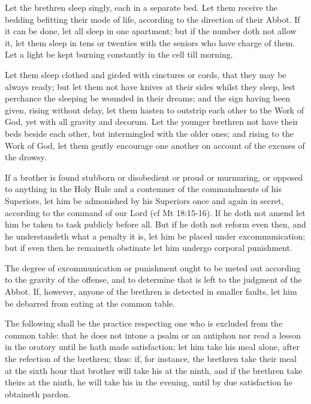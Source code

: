
Let the brethren sleep singly, each in a separate bed. Let them receive the bedding befitting their mode of life, according to the direction of their Abbot. If it can be done, let all sleep in one apartment; but if the number doth not allow it, let them sleep in tens or twenties with the seniors who have charge of them. Let a light be kept burning constantly in the cell till morning.

Let them sleep clothed and girded with cinctures or cords, that they may be always ready; but let them not have knives at their sides whilst they sleep, lest perchance the sleeping be wounded in their dreams; and the sign having been given, rising without delay, let them hasten to outstrip each other to the Work of God, yet with all gravity and decorum. Let the younger brethren not have their beds beside each other, but intermingled with the older ones; and rising to the Work of God, let them gently encourage one another on account of the excuses of the drowsy.


If a brother is found stubborn or disobedient or proud or murmuring, or opposed to anything in the Holy Rule and a contemner of the commandments of his Superiors, let him be admonished by his Superiors once and again in secret, according to the command of our Lord (cf Mt 18:15-16). If he doth not amend let him be taken to task publicly before all. But if he doth not reform even then, and he understandeth what a penalty it is, let him be placed under excommunication; but if even then he remaineth obstinate let him undergo corporal punishment.


The degree of excommunication or punishment ought to be meted out according to the gravity of the offense, and to determine that is left to the judgment of the Abbot. If, however, anyone of the brethren is detected in smaller faults, let him be debarred from eating at the common table.

The following shall be the practice respecting one who is excluded from the common table: that he does not intone a psalm or an antiphon nor read a lesson in the oratory until he hath made satisfaction; let him take his meal alone, after the refection of the brethren; thus: if, for instance, the brethren take their meal at the sixth hour that brother will take his at the ninth, and if the brethren take theirs at the ninth, he will take his in the evening, until by due satisfaction he obtaineth pardon.


